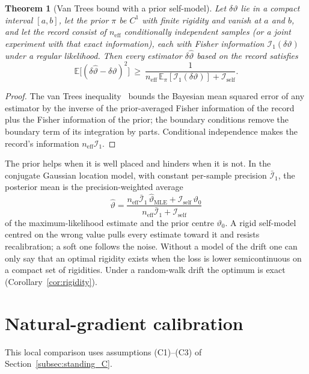 \documentclass[12pt]{article}
\newtheorem{theorem}{Theorem}
\theoremstyle{definition}
\newcommand{\E}{\mathbb E}
\begin{document}
\begin{theorem}[Van Trees bound with a prior self-model]
\label{thm:SRCR}
Let $\delta\vartheta$ lie in a compact interval $[a,b]$, let the prior $\pi$ be $C^1$ with finite rigidity and vanish at $a$ and $b$, and let the record consist of $n_{\mathrm{eff}}$ conditionally independent samples (or a joint experiment with that exact information), each with Fisher information $\mathcal I_1(\delta\vartheta)$ under a regular likelihood. Then every estimator $\delta\hat\vartheta$ based on the record satisfies
\begin{equation}
\label{eq:SRCR}
\E\bigl[(\delta\hat\vartheta-\delta\vartheta)^2\bigr]\ \ge\ \frac1{n_{\mathrm{eff}}\,\E_\pi[\mathcal I_1(\delta\vartheta)]+\mathcal I_{\mathrm{self}}}.
\end{equation}
\end{theorem}

\begin{proof}
The van Trees inequality~\cite{vanTrees1968} bounds the Bayesian mean squared error of any estimator by the inverse of the prior-averaged Fisher information of the record plus the Fisher information of the prior; the boundary conditions remove the boundary term of its integration by parts. Conditional independence makes the record's information $n_{\mathrm{eff}}\mathcal I_1$.
\end{proof}

The prior helps when it is well placed and hinders when it is not. In the conjugate Gaussian location model, with constant per-sample precision $\bar{\mathcal I}_1$, the posterior mean is the precision-weighted average
\begin{equation}
\label{eq:optimal_estimator}
\hat\vartheta=\frac{n_{\mathrm{eff}}\bar{\mathcal I}_1\,\hat\vartheta_{\mathrm{MLE}}+\mathcal I_{\mathrm{self}}\,\vartheta_0}{n_{\mathrm{eff}}\bar{\mathcal I}_1+\mathcal I_{\mathrm{self}}}
\end{equation}
of the maximum-likelihood estimate and the prior centre $\vartheta_0$. A rigid self-model centred on the wrong value pulls every estimate toward it and resists recalibration; a soft one follows the noise. Without a model of the drift one can only say that an optimal rigidity exists when the loss is lower semicontinuous on a compact set of rigidities. Under a random-walk drift the optimum is exact (Corollary~\ref{cor:rigidity}).

\section{Natural-gradient calibration}
\label{app:natural_calibration}
This local comparison uses assumptions (C1)--(C3) of
Section~\ref{subsec:standing_C}.
\end{document}

